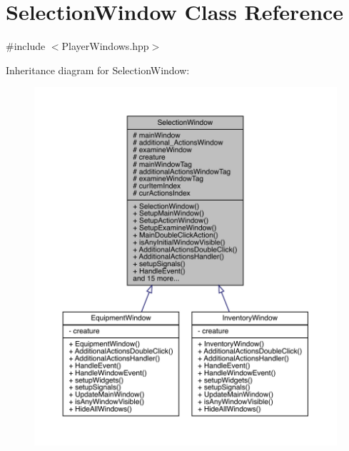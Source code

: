 \hypertarget{class_selection_window}{}\section{Selection\+Window Class Reference}
\label{class_selection_window}


{\ttfamily \#include $<$Player\+Windows.\+hpp$>$}



Inheritance diagram for Selection\+Window\+:
\nopagebreak
\begin{figure}[H]
\begin{center}
\leavevmode
\includegraphics[width=350pt]{df/d86/class_selection_window__inherit__graph}
\end{center}
\end{figure}


